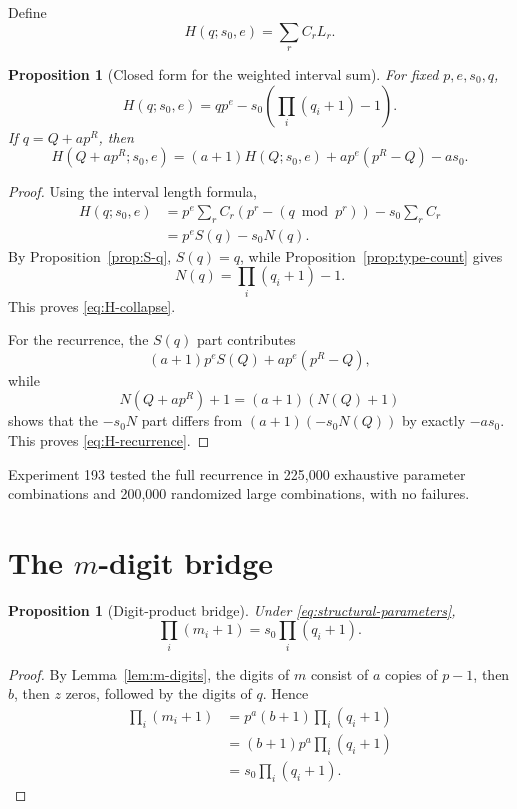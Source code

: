 \documentclass[11pt,a4paper]{article}
\newtheorem{proposition}[theorem]{Proposition}
\theoremstyle{definition}
\theoremstyle{remark}
\begin{document}
Define
\begin{equation}
 H(q;s_0,e)=\sum_r C_rL_r.
 \label{eq:H-def}
\end{equation}

\begin{proposition}[Closed form for the weighted interval sum]
\label{prop:H-collapse}
For fixed $p,e,s_0,q$,
\begin{equation}
\boxed{
H(q;s_0,e)=qp^e-s_0\left(\prod_i(q_i+1)-1\right).
}
\label{eq:H-collapse}
\end{equation}
If $q=Q+ap^R$, then
\begin{equation}
\boxed{
H(Q+ap^R;s_0,e)
=(a+1)H(Q;s_0,e)+ap^e(p^R-Q)-as_0.
}
\label{eq:H-recurrence}
\end{equation}
\end{proposition}

\begin{proof}
Using the interval length formula,
\begin{align}
H(q;s_0,e)
&=p^e\sum_r C_r\left(p^r-(q\bmod p^r)\right)-s_0\sum_rC_r\\
&=p^eS(q)-s_0N(q).
\end{align}
By Proposition~\ref{prop:S-q}, $S(q)=q$, while Proposition~\ref{prop:type-count} gives
\[
N(q)=\prod_i(q_i+1)-1.
\]
This proves \eqref{eq:H-collapse}.

For the recurrence, the $S(q)$ part contributes
\[
(a+1)p^eS(Q)+ap^e(p^R-Q),
\]
while
\[
N(Q+ap^R)+1=(a+1)(N(Q)+1)
\]
shows that the $-s_0N$ part differs from $(a+1)(-s_0N(Q))$ by exactly $-as_0$.  This proves \eqref{eq:H-recurrence}.
\end{proof}

Experiment 193 tested the full recurrence in 225,000 exhaustive parameter combinations and 200,000 randomized large combinations, with no failures.

\section{The $m$-digit bridge}

\begin{proposition}[Digit-product bridge]
\label{prop:digit-bridge}
Under \eqref{eq:structural-parameters},
\begin{equation}
\boxed{
\prod_i(m_i+1)=s_0\prod_i(q_i+1).
}
\label{eq:m-q-product}
\end{equation}
\end{proposition}

\begin{proof}
By Lemma~\ref{lem:m-digits}, the digits of $m$ consist of $a$ copies of $p-1$, then $b$, then $z$ zeros, followed by the digits of $q$.  Hence
\begin{align}
\prod_i(m_i+1)
&=p^a(b+1)\prod_i(q_i+1)\\
&=(b+1)p^a\prod_i(q_i+1)\\
&=s_0\prod_i(q_i+1).
\end{align}
\end{proof}
\end{document}
